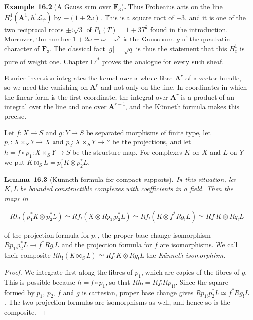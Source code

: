\documentclass[11pt]{article}
\newenvironment{bpstatement}[2]{\par\addvspace{0.6\baselineskip}\noindent\textbf{#1}#2\textbf{.}\enspace\ignorespaces}
  {\par\addvspace{0.4\baselineskip}}
\newenvironment{bpstatementit}[2]{\begin{bpstatement}{#1}{#2}\itshape\ignorespaces}{\end{bpstatement}}
\newcommand{\bpout}[1]{#1\textsuperscript{\hyperlink{bp-outside}{\ensuremath{\ast}}}}
\begin{document}
\begin{bpstatement}{Example~16.2}{ (A Gauss sum over $\mathbf F_3$)}
Thus Frobenius acts on the line \(H^1_c(\mathbf A^1,h^*\mathcal L_\psi)\) by \(-(1+2\omega)\). This is a square root of \(-3\), and it is one of the two reciprocal roots \(\pm i\sqrt3\) of \(P_1(T)=1+3T^2\) found in the introduction. Moreover, the number \(1+2\omega=\omega-\omega^2\) is the Gauss sum \(g\) of the quadratic character of \(\mathbf F_3\). The classical fact \(|g|=\sqrt q\) is thus the statement that this \(H^1_c\) is pure of weight one. Chapter \bpout{17} proves the analogue for every such sheaf.
\end{bpstatement}

\label{bp9}%
Fourier inversion integrates the kernel over a whole fibre \(\mathbf A^r\) of a vector bundle, so we need the vanishing on \(\mathbf A^r\) and not only on the line. In coordinates in which the linear form is the first coordinate, the integral over \(\mathbf A^r\) is a product of an integral over the line and one over \(\mathbf A^{r-1}\), and the Künneth formula makes this precise.

Let \(f:X\to S\) and \(g:Y\to S\) be separated morphisms of finite type, let \(p_1:X\times_SY\to X\) and \(p_2:X\times_SY\to Y\) be the projections, and let \(h=f\circ p_1:X\times_SY\to S\) be the structure map. For complexes \(K\) on \(X\) and \(L\) on \(Y\) we put \(K\boxtimes_SL=p_1^*K\otimes p_2^*L\).

\label{bp10}%
\begin{bpstatementit}{Lemma~16.3}{ (Künneth formula for compact supports)}
In this situation, let \(K,L\) be bounded constructible complexes with coefficients in a field. Then the maps in

\[
Rh_!(p_1^*K\otimes p_2^*L)
\simeq Rf_!(K\otimes Rp_{1!}p_2^*L)
\simeq Rf_!(K\otimes f^*Rg_!L)
\simeq Rf_!K\otimes Rg_!L
\]

of the projection formula for \(p_1\), the proper base change isomorphism \(Rp_{1!}p_2^*L\to f^*Rg_!L\) and the projection formula for \(f\) are isomorphisms. We call their composite \(Rh_!(K\boxtimes_SL)\simeq Rf_!K\otimes Rg_!L\) the \emph{Künneth isomorphism}.
\end{bpstatementit}

\begin{proof}[{Proof}]\label{bp11}%
We integrate first along the fibres of \(p_1\), which are copies of the fibres of \(g\). This is possible because \(h=f\circ p_1\), so that \(Rh_!=Rf_!Rp_{1!}\). Since the square formed by \(p_1\), \(p_2\), \(f\) and \(g\) is cartesian, proper base change gives \(Rp_{1!}p_2^*L\simeq f^*Rg_!L\). The two projection formulas are isomorphisms as well, and hence so is the composite.
\end{proof}
\end{document}
